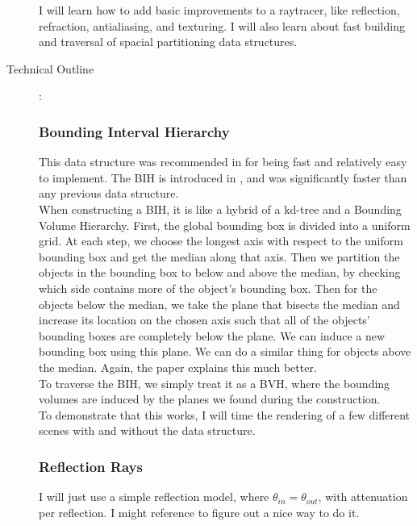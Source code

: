 \documentclass {article}
\begin{document}
\begin{description}
	I will learn how to add basic improvements to a raytracer, like reflection, refraction,
    antialiasing, and texturing.
    I will also learn about fast building and traversal of spacial partitioning data structures.

\item[Technical Outline]:

\subsubsection*{Bounding Interval Hierarchy} 
    This data structure was recommended in \cite{CGF13} for being fast and relatively
    easy to implement. The BIH is introduced in \cite{Wa06}, and was significantly faster
    than any previous data structure. \\
    
    When constructing a BIH, it is like a hybrid of a kd-tree and a Bounding Volume Hierarchy. 
    First, the global bounding box is divided into a uniform grid. At each step, we choose
    the longest axis with respect to the uniform bounding box and get the median along that axis. 
    Then we partition the objects in the bounding box to below and above the median, by checking
    which side contains more of the object's bounding box. 
    Then for the objects below the median, we take the plane that bisects
    the median and increase its location on the chosen axis such that all of the objects' bounding
    boxes are completely below the plane. We can induce a new bounding box using this plane.
    We can do a similar thing for objects above the median. Again, the paper \cite{Wa06} 
    explains this much better. \\

    To traverse the BIH, we simply treat it as a BVH, where the bounding volumes are induced
    by the planes we found during the construction. \\

    To demonstrate that this works, I will time the rendering of a few different scenes
    with and without the data structure.

\subsubsection*{Reflection Rays}
    I will just use a simple reflection model, where $\theta_{in} = \theta_{out}$, with
    attenuation per reflection. I might reference \cite{PG10} to figure out a nice way
    to do it.


\end{description}
\end{document}
